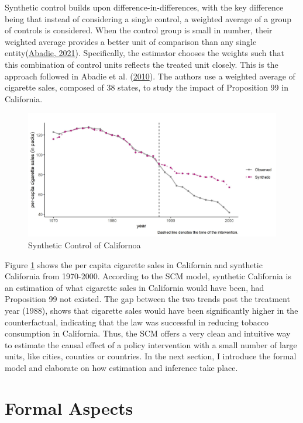 \documentclass[12pt,nobind, a4paper]{reedthesis}
\begin{document}
 Synthetic control builds upon difference-in-differences, with the key difference being that instead of considering a single control, a weighted average of a group of controls is considered. When the control group is small in number, their weighted average provides a better unit of comparison than any single entity(\protect\hyperlink{ref-abadie_using_2021}{Abadie, 2021}). Specifically, the estimator chooses the weights such that this combination of control units reflects the treated unit closely. This is the approach followed in Abadie et al. (\protect\hyperlink{ref-abadie_synthetic_2010}{2010}). The authors use a weighted average of cigarette sales, composed of 38 states, to study the impact of Proposition 99 in California.
 \begin{figure}

 {\centering \includegraphics[width=1\linewidth]{figure/caltrends} 

 }

 \caption{Synthetic Control of Californoa}\label{fig:prop}
 \end{figure}
 Figure \ref{fig:prop} shows the per capita cigarette sales in California and synthetic California from 1970-2000. According to the SCM model, synthetic California is an estimation of what cigarette sales in California would have been, had Proposition 99 not existed. The gap between the two trends post the treatment year (1988), shows that cigarette sales would have been significantly higher in the counterfactual, indicating that the law was successful in reducing tobacco consumption in California. Thus, the SCM offers a very clean and intuitive way to estimate the causal effect of a policy intervention with a small number of large units, like cities, counties or countries. In the next section, I introduce the formal model and elaborate on how estimation and inference take place.

 \hypertarget{formal-aspects}{%
 \section{Formal Aspects}\label{formal-aspects}}
\end{document}
